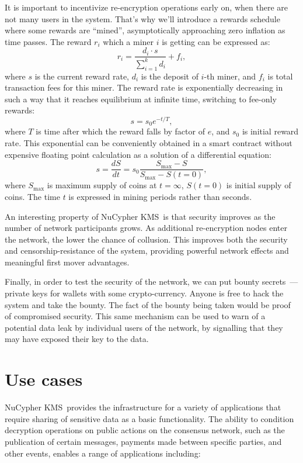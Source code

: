 \documentclass[longbibliography,nofootinbib]{revtex4-1}
\newcommand{\kms}{NuCypher KMS}
\begin{document}
It is important to incentivize re-encryption operations early on, when there are not many users in the system.
That's why we'll introduce a rewards schedule where some rewards are ``mined'', asymptotically approaching zero inflation as time passes.
The reward $r_i$ which a miner $i$ is getting can be expressed as:
\begin{equation}
    r_i = \frac{d_i \cdot s}{\sum_{i=1}^k d_i} + f_i,
\end{equation}
where $s$ is the current reward rate, $d_i$ is the deposit of $i$-th miner, and $f_i$ is total transaction fees for this miner.
The reward rate is exponentially decreasing in such a way that it reaches equilibrium at infinite time, switching to fee-only rewards:
\begin{equation}
    s = s_0 e^{-t/T},
\end{equation}
where $T$ is time after which the reward falls by factor of $e$, and $s_0$ is initial reward rate.
This exponential can be conveniently obtained in a smart contract without expensive floating point calculation as a solution of a differential equation:
\begin{equation}
    s = \frac{dS}{dt}= s_0 \frac{S_{\max} - S}{S_{\max} - S(t=0)},
\end{equation}
where $S_{\max}$ is maximum supply of coins at $t=\infty$, $S(t=0)$ is initial supply of coins.
The time $t$ is expressed in mining periods rather than seconds.

An interesting property of \kms~is that security improves as the number of network participants grows. As additional re-encryption
nodes enter the network, the lower the chance of collusion.
This improves both the security and censorship-resistance of the system, providing powerful network effects and meaningful first mover advantages.

Finally, in order to test the security of the network, we can put bounty secrets~--- private keys for wallets with
some crypto-currency.
Anyone is free to hack the system and take the bounty.
The fact of the bounty being taken would be proof of compromised security.
This same mechanism can be used to warn of a potential data leak by individual users of the network, by signalling that they may have exposed
their key to the data.

\section{Use cases}
\kms~provides the infrastructure for a variety of applications that require sharing of sensitive data as a basic
functionality. The ability to condition decryption operations on public actions on the consensus network, such as the publication
of certain messages, payments made between specific parties, and other events, enables a range of applications including:
\end{document}
